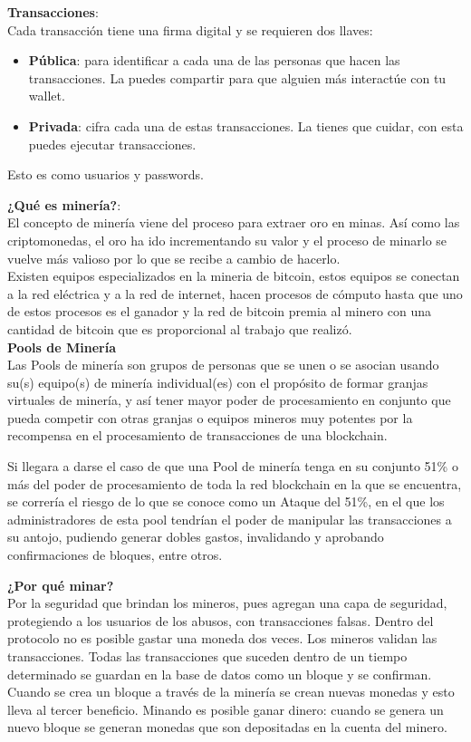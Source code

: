 \documentclass[a4paper,12pt]{lib/pub}
\begin{document}
\textbf{Transacciones}:\\
Cada transacción tiene una firma digital y se requieren dos llaves:
\begin{itemize}	
\item \textbf{Pública}: para identificar a cada una de las personas que hacen las transacciones.
La puedes compartir para que alguien más interactúe con tu wallet.
\item \textbf{Privada}: cifra cada una de estas transacciones.
La tienes que cuidar, con esta puedes ejecutar transacciones.
\end{itemize}
Esto es como usuarios y passwords.

\textbf{¿Qué es minería?}:\\
El concepto de minería viene del proceso para extraer oro en minas. Así como las criptomonedas, el oro ha ido incrementando su valor y el proceso de minarlo se vuelve más valioso por lo que se recibe a cambio de hacerlo.\\
Existen equipos especializados en la mineria de bitcoin, estos equipos se conectan a la red eléctrica y a la red de internet, hacen procesos de cómputo hasta que uno de estos procesos es el ganador y la red de bitcoin premia al minero con una cantidad de bitcoin que es proporcional al trabajo que realizó.
\\

\textbf{Pools de Minería}\\

Las Pools de minería son grupos de personas que se unen o se asocian usando su(s) equipo(s) de minería individual(es) con el propósito de formar granjas virtuales de minería, y así tener mayor poder de procesamiento en conjunto que pueda competir con otras granjas o equipos mineros muy potentes por la recompensa en el procesamiento de transacciones de una blockchain.

Si llegara a darse el caso de que una Pool de minería tenga en su conjunto 51\% o más del poder de procesamiento de toda la red blockchain en la que se encuentra, se correría el riesgo de lo que se conoce como un Ataque del 51\%, en el que los administradores de esta pool tendrían el poder de manipular las transacciones a su antojo, pudiendo generar dobles gastos, invalidando y aprobando confirmaciones de bloques, entre otros.

\textbf{¿Por qué minar?}\\

Por la seguridad que brindan los mineros, pues agregan una capa de seguridad, protegiendo a los usuarios de los abusos, con transacciones falsas. Dentro del protocolo no es posible gastar una moneda dos veces. Los mineros validan las transacciones.
Todas las transacciones que suceden dentro de un tiempo determinado se guardan en la base de datos como un bloque y se confirman. Cuando se crea un bloque a través de la minería se crean nuevas monedas y esto lleva al tercer beneficio.
Minando es posible ganar dinero: cuando se genera un nuevo bloque se generan monedas que son depositadas en la cuenta del minero.
\end{document}
